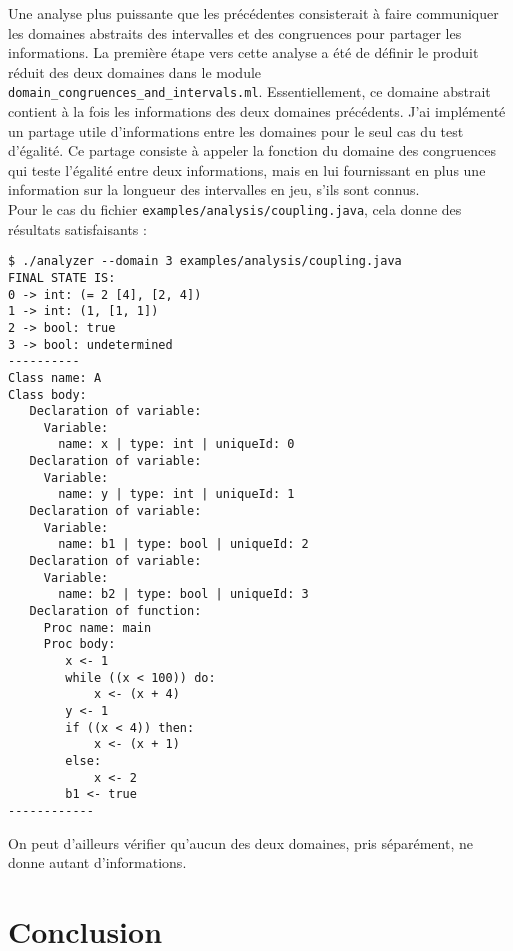 \documentclass[paper=a4, fontsize=11pt]{scrartcl}
\numberwithin{figure}{section}			%
\numberwithin{table}{section}				%
\begin{document}
Une analyse plus puissante que les précédentes consisterait à faire communiquer les domaines abstraits des intervalles et des congruences pour partager les informations. La première étape vers cette analyse a été de définir le produit réduit des deux domaines dans le module \texttt{domain\_congruences\_and\_intervals.ml}. Essentiellement, ce domaine abstrait contient à la fois les informations des deux domaines précédents. J'ai implémenté un partage utile d'informations entre les domaines pour le seul cas du test d'égalité. Ce partage consiste à appeler la fonction du domaine des congruences qui teste l'égalité entre deux informations, mais en lui fournissant en plus une information sur la longueur des intervalles en jeu, s'ils sont connus.\\

Pour le cas du fichier \texttt{examples/analysis/coupling.java}, cela donne des résultats satisfaisants :

\begin{verbatim}
$ ./analyzer --domain 3 examples/analysis/coupling.java
FINAL STATE IS:
0 -> int: (= 2 [4], [2, 4])
1 -> int: (1, [1, 1])
2 -> bool: true
3 -> bool: undetermined
----------
Class name: A
Class body:
   Declaration of variable:
     Variable:
       name: x | type: int | uniqueId: 0
   Declaration of variable:
     Variable:
       name: y | type: int | uniqueId: 1
   Declaration of variable:
     Variable:
       name: b1 | type: bool | uniqueId: 2
   Declaration of variable:
     Variable:
       name: b2 | type: bool | uniqueId: 3
   Declaration of function:
     Proc name: main
     Proc body:
        x <- 1
        while ((x < 100)) do:
            x <- (x + 4)
        y <- 1
        if ((x < 4)) then:
            x <- (x + 1)
        else:
            x <- 2
        b1 <- true
------------
\end{verbatim}

On peut d'ailleurs vérifier qu'aucun des deux domaines, pris séparément, ne donne autant d'informations.

\section{Conclusion}
\end{document}
